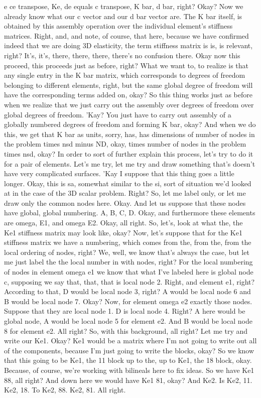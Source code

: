 \documentclass[10pt]{article}
\begin{document}
e ce transpose, Ke, de equals c transpose, K bar, d bar, right? Okay? Now we already know what our c vector and our d bar vector are. The K bar itself, is obtained by this assembly operation over the individual element's stiffness matrices. Right, and, and note, of course, that here, because we have confirmed indeed that we are doing 3D elasticity, the term stiffness matrix is is, is relevant, right? It's, it's, there, there, there, there's no confusion there. Okay now this proceed, this proceeds just as before, right? What we want to, to realize is that any single entry in the K bar matrix, which corresponds to degrees of freedom belonging to different elements, right, but the same global degree of freedom will have the corresponding terms added on, okay? So this thing works just as before when we realize that we just carry out the assembly over degrees of freedom over global degrees of freedom. 'Kay? You just have to carry out assembly of a globally numbered degrees of freedom and forming K bar, okay? And when we do this, we get that K bar as units, sorry, has, has dimensions of number of nodes in the problem times nsd minus ND, okay, times number of nodes in the problem times nsd, okay? In order to sort of further explain this process, let's try to do it for a pair of elements. Let's me try, let me try and draw something that's doesn't have very complicated surfaces. 'Kay I suppose that this thing goes a little longer. Okay, this is sa, somewhat similar to the si, sort of situation we'd looked at in the case of the 3D scalar problem. Right? So, let me label only, or let me draw only the common nodes here. Okay. And let us suppose that these nodes have global, global numbering. A, B, C, D. Okay, and furthermore these elements are omega, E1, and omega E2. Okay, all right. So, let's, look at what the, the Ke1 stiffness matrix may look like, okay? Now, let's suppose that for the Ke1 stiffness matrix we have a numbering, which comes from the, from the, from the local ordering of nodes, right? We, well, we know that's always the case, but let me just label the the local number in with nodes, right? For the local numbering of nodes in element omega e1 we know that what I've labeled here is global node c, supposing we say that, that, that is local node 2. Right, and element e1, right? According to that, D would be local node 3, right? A would be local node 6 and B would be local node 7. Okay? Now, for element omega e2 exactly those nodes. Suppose that they are local node 1. D is local node 4. Right? A here would be global node, A would be local node 5 for element e2. And B would be local node 8 for element e2. All right? So, with this background, all right? Let me try and write our Ke1. Okay? Ke1 would be a matrix where I'm not going to write out all of the components, because I'm just going to write the blocks, okay? So we know that this going to be Ke1, the 11 block up to the, up to Ke1, the 18 block, okay. Because, of course, we're working with bilineals here to fix ideas. So we have Ke1 88, all right? And down here we would have Ke1 81, okay? And Ke2. Is Ke2, 11. Ke2, 18. To Ke2, 88. Ke2, 81. All right.
\end{document}
